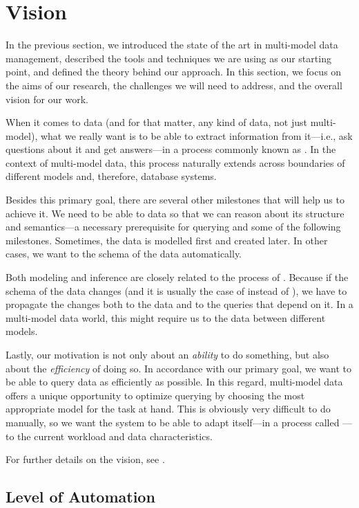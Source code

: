 \section{Vision}

In the previous section, we introduced the state of the art in multi-model data management, described the tools and techniques we are using as our starting point, and defined the theory behind our approach. In this section, we focus on the aims of our research, the challenges we will need to address, and the overall vision for our work.

When it comes to data (and for that matter, any kind of data, not just multi-model), what we really want is to be able to extract information from it---i.e., ask questions about it and get answers---in a process commonly known as . In the context of multi-model data, this process naturally extends across boundaries of different models and, therefore, database systems.

Besides this primary goal, there are several other milestones that will help us to achieve it. We need to be able to  data so that we can reason about its structure and semantics---a necessary prerequisite for querying and some of the following milestones. Sometimes, the data is modelled first and created later. In other cases, we want to  the schema of the data automatically.

Both modeling and inference are closely related to the process of . Because if the schema of the data changes (and it is usually the case of  instead of ), we have to propagate the changes both to the data and to the queries that depend on it. In a multi-model data world, this might require us to  the data between different models.

Lastly, our motivation is not only about an \emph{ability} to do something, but also about the \emph{efficiency} of doing so. In accordance with our primary goal, we want to be able to query data as efficiently as possible. In this regard, multi-model data offers a unique opportunity to optimize querying by choosing the most appropriate model for the task at hand. This is obviously very difficult to do manually, so we want the system to be able to adapt itself---in a process called ---to the current workload and data characteristics.

For further details on the vision, see .

\subsection{Level of Automation}
\label{sec:vision_automation}

